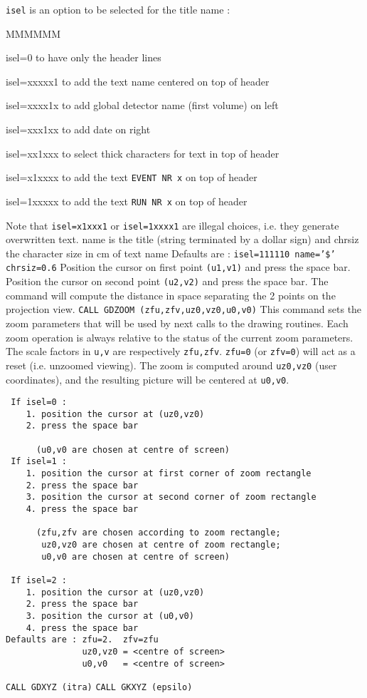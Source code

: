{\tt isel} is an option to be selected for the title name :
\begin{DL}{MMMMMM}
\item[isel=0] to have only the header lines
\item[isel=xxxxx1] to add the text name centered on top of header
\item[isel=xxxx1x] to add global detector name (first volume) on left
\item[isel=xxx1xx] to add date on right
\item[isel=xx1xxx] to select thick characters for text in top of header
\item[isel=x1xxxx] to add the text {\tt EVENT NR x} on top of header
\item[isel=1xxxxx] to add the text {\tt RUN NR x} on top of header
\end{DL}
Note that {\tt isel=x1xxx1} or {\tt isel=1xxxx1} are illegal choices,
i.e. they generate overwritten text.
name is the title (string terminated by a dollar sign)
and chrsiz the character size in cm of text name
Defaults are : {\tt isel=111110 name='\$' chrsiz=0.6}
Position the cursor on first point {\tt(u1,v1)} and press the space bar.
Position the cursor on second point {\tt(u2,v2)} and press the space bar.
The command will compute the distance in space separating
the 2 points on the projection view.
{\tt CALL GDZOOM (zfu,zfv,uz0,vz0,u0,v0)}
This command sets the zoom parameters that will be used by
next calls to the drawing routines. Each zoom operation is always
relative to the status of the current zoom parameters.
The scale factors in {\tt u,v} are respectively  {\tt zfu,zfv}.
{\tt zfu=0} (or {\tt zfv=0}) will act as a reset (i.e. unzoomed viewing).
The zoom is computed around
{\tt uz0,vz0} (user coordinates), and the
resulting picture will be centered at {\tt u0,v0}.
\begin{verbatim}
 If isel=0 :
    1. position the cursor at (uz0,vz0)
    2. press the space bar
 
      (u0,v0 are chosen at centre of screen)
 If isel=1 :
    1. position the cursor at first corner of zoom rectangle
    2. press the space bar
    3. position the cursor at second corner of zoom rectangle
    4. press the space bar
 
      (zfu,zfv are chosen according to zoom rectangle;
       uz0,vz0 are chosen at centre of zoom rectangle;
       u0,v0 are chosen at centre of screen)
 
 If isel=2 :
    1. position the cursor at (uz0,vz0)
    2. press the space bar
    3. position the cursor at (u0,v0)
    4. press the space bar
Defaults are : zfu=2.  zfv=zfu
               uz0,vz0 = <centre of screen>
               u0,v0   = <centre of screen>
\end{verbatim}
{\tt CALL GDXYZ (itra)}
{\tt CALL GKXYZ (epsilo)}
 
